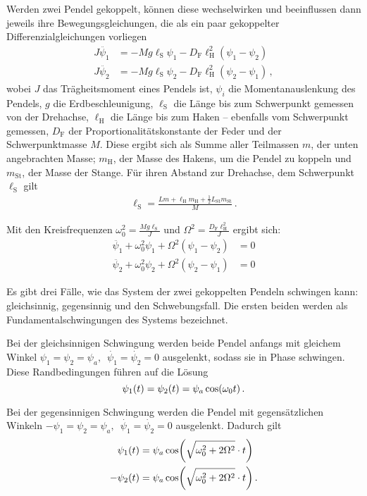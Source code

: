 \documentclass[
12pt,
a4paper,
bibliography=totocnumbered, %
BCOR=1cm, %
oneside, %
]{scrartcl}
\newcommand{\lh}{\ell_{\mathrm{H}}}
\newcommand{\ls}{\ell_{\mathrm{S}}}
\begin{document}
Werden zwei Pendel gekoppelt, können diese wechselwirken und beeinflussen dann jeweils ihre Bewegungsgleichungen, die als ein paar gekoppelter Differenzialgleichungen vorliegen
\begin{align}
	J\ddot{\psi_1} &= -Mg\ls\psi_1 - D_{\text{F}}\lh^2(\psi_1-\psi_2)\\
	J\ddot{\psi_2} &= -Mg\ls\psi_2 - D_{\text{F}}\lh^2(\psi_2-\psi_1)\,,
\end{align}
wobei \(J\) das Trägheitsmoment eines Pendels ist, \(\psi_i\) die Momentanauslenkung des Pendels, \(g\) die Erdbeschleunigung, \(\ls\) die Länge bis zum Schwerpunkt gemessen von der Drehachse, \(\lh\) die Länge bis zum Haken -- ebenfalls vom Schwerpunkt gemessen, \(D_{\text{F}}\) der Proportionalitätskonstante der Feder und der Schwerpunktmasse \(M\). Diese  ergibt sich als Summe aller Teilmassen \(m\), der unten angebrachten Masse;  \(m_{\text{H}}\), der Masse des Hakens, um die Pendel zu koppeln und \(m_{\text{St}}\), der Masse der Stange. Für ihren Abstand zur Drehachse, dem Schwerpunkt \(\ell_{\text{S}}\) gilt
\begin{align}\label{eq:schwerp}
	\ell_{\text{S}} = \frac{Lm + \lh m_{\text{H}} + \frac{1}{2} L_{\text{St}} m_{\text{St}}}{M} \,.
\end{align}

Mit den Kreisfrequenzen \(\omega_0^2=\frac{Mg\ls}{J} \label{eq:eig}\)  und  \(\Omega^2=\frac{D_{\text{F}}\lh^2}{J}\) ergibt sich:
\begin{align}
	\ddot{\psi_1} + \omega_0^2\psi_1 + \Omega^2(\psi_1-\psi_2) &= 0\\
	\ddot{\psi_2} + \omega_0^2\psi_2 + \Omega^2(\psi_2-\psi_1) &= 0
\end{align}

Es gibt drei Fälle, wie das System der zwei gekoppelten Pendeln schwingen kann: gleichsinnig, gegensinnig und den Schwebungsfall. Die ersten beiden werden als Fundamentalschwingungen des Systems bezeichnet.

Bei der gleichsinnigen Schwingung werden beide Pendel anfangs mit gleichem Winkel \(\psi_1 = \psi_2 = \psi_a, \enspace \dot{\psi_1} = \dot{\psi_2} = 0\) ausgelenkt, sodass sie in Phase schwingen. Diese Randbedingungen führen auf die Lösung
\begin{equation}
	\psi_1(t) = \psi_2(t) = \psi_a \cos\mleft(\omega_0t\mright) \,.
\end{equation}

Bei der gegensinnigen Schwingung werden die Pendel mit gegensätzlichen Winkeln \(-\psi_1 = \psi_2 = \psi_a, \enspace \dot{\psi_1} = \dot{\psi_2} = 0\) ausgelenkt. Dadurch gilt
\begin{align}
	\psi_1(t)  &= \psi_a \cos\mleft(\sqrt{\omega_0^2+2\Omega^2}\cdot t\mright)\\
	-\psi_2(t) &= \psi_a \cos\mleft(\sqrt{\omega_0^2+2\Omega^2}\cdot t\mright) \,.
\end{align}
\end{document}
